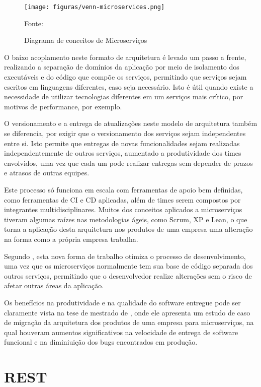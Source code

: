 \begin{figure}[H]
	\centering
	\caption{Diagrama de conceitos de Microserviços}
	\texttt{[image: figuras/venn-microservices.png]}

	\label{fig:venn-microservices}
	\footnotesize Fonte: 
\end{figure}

O baixo acoplamento neste formato de arquitetura é levado um passo a frente,
realizando a separação de domínios da aplicação por meio de isolamento dos
executáveis e do código que compõe os serviços, permitindo que serviços
sejam escritos em linguagens diferentes, caso seja necessário. Isto é útil
quando existe a necessidade de utilizar tecnologias diferentes em um
serviços mais crítico, por motivos de performance, por exemplo.

O versionamento e a entrega de atualizações neste modelo de arquitetura
também se diferencia, por exigir que o versionamento dos serviços sejam
independentes entre si. Isto permite que entregas de novas funcionalidades
sejam realizadas independentemente de outros serviços, aumentado a
produtividade dos times envolvidos, uma vez que cada um pode realizar entregas
sem depender de prazos e atrasos de outras equipes.

Este processo só funciona em escala com ferramentas de apoio bem definidas,
como ferramentas de \ac{CI} e \ac{CD} aplicadas, além de times serem compostos
por integrantes multidisciplinares. Muitos dos conceitos aplicados a
microserviços tiveram algumas raízes nas metodologias ágeis, como Scrum, XP e
Lean, o que torna a aplicação desta arquitetura nos produtos de uma empresa
uma alteração na forma como a própria empresa trabalha.

Segundo , esta nova forma de trabalho otimiza o processo
de desenvolvimento, uma vez que os microserviços normalmente tem sua base de
código separada dos outros serviços, permitindo que o desenvolvedor realize
alterações sem o risco de afetar outras áreas da aplicação.

Os benefícios na produtividade e na qualidade do software entregue pode
ser claramente vista na tese de mestrado de , onde
ele apresenta um estudo de caso de migração da arquitetura dos produtos
de uma empresa para microserviços, na qual houveram aumentos significativos na
velocidade de entrega de software funcional e na diminiuição dos bugs
encontrados em produção.

\section{REST}

